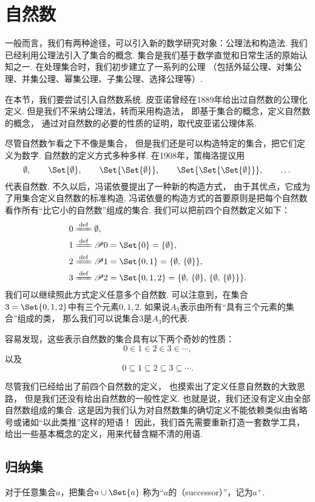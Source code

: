 \section{自然数}
一般而言，我们有两种途径，可以引入新的数学研究对象：公理法和构造法.
我们已经利用公理法引入了集合的概念.
集合是我们基于数学直觉和日常生活的原始认知之一.
在处理集合时，我们初步建立了一系列的公理%
（包括外延公理、对集公理、并集公理、幂集公理、子集公理、选择公理等）.

在本节，我们要尝试引入自然数系统.
皮亚诺曾经在1889年给出过自然数的公理化定义.
但是我们不采纳公理法，转而采用构造法，
即基于集合的概念，定义自然数的概念，
通过对自然数的必要的性质的证明，取代皮亚诺公理体系.

尽管自然数乍看之下不像是集合，
但是我们还是可以构造特定的集合，把它们定义为数字.
自然数的定义方式多种多样.
在1908年，策梅洛提议用\[
	\emptyset, \qquad
	\Set{\emptyset}, \qquad
	\Set{\Set{\emptyset}}, \qquad
	\Set{\Set{\Set{\emptyset}}}, \qquad
	\dotsc
\]代表自然数.
不久以后，冯诺依曼提出了一种新的构造方式，
由于其优点，它成为了用集合定义自然数的标准构造.
冯诺依曼的构造方式的首要原则是把每个自然数看作所有“比它小的自然数”组成的集合.
我们可以把前四个自然数定义如下：\begin{align*}
	&0 \defeq \emptyset, \\
	&1 \defeq \Powerset0 = \Set{0} = \NaturalSet{1}, \\
	&2 \defeq \Powerset1 = \Set{0,1} = \NaturalSet{2}, \\
	&3 \defeq \Powerset2 = \Set{0,1,2} = \NaturalSet{3}.
\end{align*}
我们可以继续照此方式定义任意多个自然数.
可以注意到，在集合\(3=\Set{0,1,2}\)中有三个元素\(0,1,2\).
如果说\(A_3\)表示由所有“具有三个元素的集合”组成的类，
那么我们可以说集合\(3\)是\(A_3\)的代表.

容易发现，这些表示自然数的集合具有以下两个奇妙的性质：\[
	0 \in 1 \in 2 \in 3 \in \dotsb,
\]
以及\[
	0 \subseteq 1 \subseteq 2 \subseteq 3 \subseteq \dotsb.
\]

尽管我们已经给出了前四个自然数的定义，
也摸索出了定义任意自然数的大致思路，
但是我们还没有给出自然数的一般性定义.
也就是说，我们还没有定义由全部自然数组成的集合.
这是因为我们认为对自然数集的确切定义不能依赖类似由省略号或诸如“以此类推”这样的短语！
因此，我们首先需要重新打造一套数学工具，给出一些基本概念的定义，用来代替含糊不清的用语.

\subsection{归纳集}
\begin{definition}[后继]\label{definition:集合论.后继的定义}
对于任意集合\(a\)，把集合\(a \cup \Set{a}\)%
称为“\(a\)的（successor）”，记为\(a^+\).
\end{definition}

